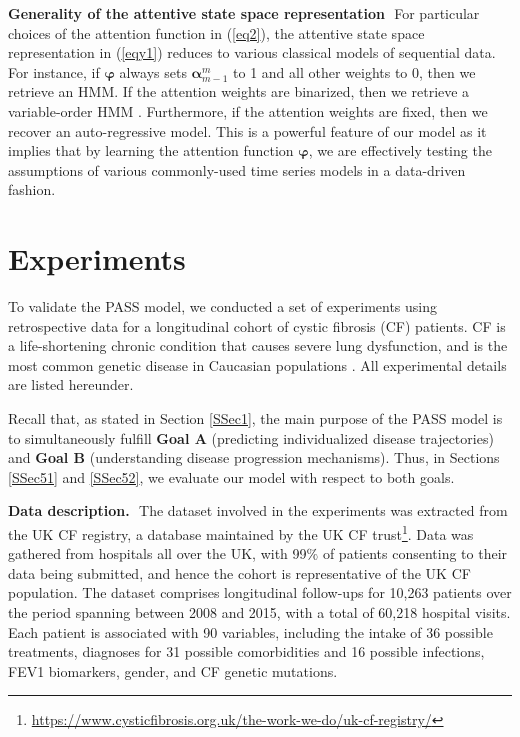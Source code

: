 \documentclass[twoside,11pt]{article}
\begin{document}
{\bf Generality of the attentive state space representation}\,\, For particular choices of the attention function in (\ref{eq2}), the attentive state space representation in (\ref{eqy1}) reduces to various classical models of sequential data. For instance, if \mbox{\footnotesize $\boldsymbol{\varphi}$} always sets \mbox{\footnotesize $\boldsymbol{\alpha}^m_{m-1}$} to 1 and all other weights to 0, then we retrieve an HMM. If the attention weights are binarized, then we retrieve a variable-order HMM \cite{willems1995context, begleiter2004prediction}. Furthermore, if the attention weights are fixed, then we recover an auto-regressive model. This is a powerful feature of our model as it implies that by learning the attention function \mbox{\footnotesize $\boldsymbol{\varphi}$}, we are effectively testing the assumptions of various commonly-used time series models in a data-driven fashion.

\section{Experiments}
\label{Sec5}
To validate the PASS model, we conducted a set of experiments using retrospective data for a longitudinal cohort of cystic fibrosis (CF) patients. CF is a life-shortening chronic condition that causes severe lung dysfunction, and is the most common genetic disease in Caucasian populations \cite{szczesniak2017phenotypes}. All experimental details are listed hereunder. 

Recall that, as stated in Section \ref{SSec1}, the main purpose of the PASS model is to simultaneously fulfill {\bf Goal A} (predicting individualized disease trajectories) and {\bf Goal B} (understanding disease progression mechanisms). Thus, in Sections \ref{SSec51} and \ref{SSec52}, we evaluate our model with respect to both goals.

{\bf Data description.}\,\, The dataset involved in the experiments was extracted from the UK CF registry, a database maintained by the UK CF trust\footnote{\url{https://www.cysticfibrosis.org.uk/the-work-we-do/uk-cf-registry/}}. Data was gathered from hospitals all over the UK, with 99$\%$ of patients consenting to their data being submitted, and hence the cohort is representative of the UK CF population. The dataset comprises longitudinal follow-ups for 10,263 patients over the period spanning between 2008 and 2015, with a total of 60,218 hospital visits. Each patient is associated with 90 variables, including the intake of 36 possible treatments, diagnoses for 31 possible comorbidities and 16 possible infections, FEV1 biomarkers, gender, and CF genetic mutations. 
\end{document}
